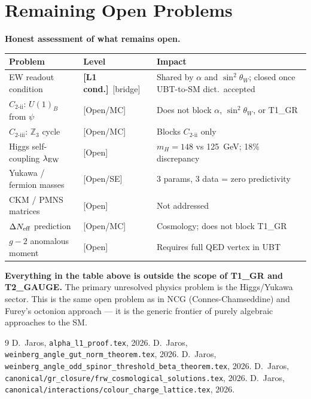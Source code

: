 \documentclass[12pt,a4paper]{article}
\theoremstyle{remark}\newtheorem{remark}[theorem]{Remark}
\newcommand{\Lc}{\textbf{[L1 cond.]}}
\begin{document}
\section{Remaining Open Problems}
\label{sec:open}

\begin{statusbox}
\textbf{Honest assessment of what remains open.}

\begin{center}
\renewcommand{\arraystretch}{1.25}\footnotesize
\begin{tabular}{p{5cm}p{2.2cm}p{5cm}}
\toprule
Problem & Level & Impact \\
\midrule
EW readout condition & \Lc\ [bridge] & Shared by $\alpha$ and $\sin^2\theta_W$;
  closed once UBT-to-SM dict.\ accepted \\
$C_{2\text{-ii}}$: $U(1)_B$ from $\psi$ & [Open/MC] & Does not block
  $\alpha$, $\sin^2\theta_W$, or T1\_GR \\
$C_{2\text{-iii}}$: $\mathbb{Z}_3$ cycle & [Open/MC] & Blocks $C_{2\text{-ii}}$
  only \\
Higgs self-coupling $\lambda_{\rm EW}$ & [Open] & $m_H=148$ vs 125~GeV;
  18\% discrepancy \\
Yukawa / fermion masses & [Open/SE] & 3 params, 3 data = zero predictivity \\
CKM / PMNS matrices & [Open] & Not addressed \\
$\Delta N_{\rm eff}$ prediction & [Open/MC] & Cosmology; does not block T1\_GR \\
$g{-}2$ anomalous moment & [Open] & Requires full QED vertex in UBT \\
\bottomrule
\end{tabular}
\end{center}

\medskip
\textbf{Everything in the table above is outside the scope of T1\_GR and T2\_GAUGE.}
The primary unresolved physics problem is the Higgs/Yukawa sector.
This is the same open problem as in NCG (Connes-Chamseddine) and
Furey's octonion approach — it is the generic frontier of purely
algebraic approaches to the SM.
\end{statusbox}

\begin{thebibliography}{9}
  D.~Jaros, \texttt{alpha\_l1\_proof.tex}, 2026.
  D.~Jaros, \texttt{weinberg\_angle\_gut\_norm\_theorem.tex}, 2026.
  D.~Jaros, \texttt{weinberg\_angle\_odd\_spinor\_threshold\_beta\_theorem.tex}, 2026.
  D.~Jaros, \texttt{canonical/gr\_closure/frw\_cosmological\_solutions.tex}, 2026.
  D.~Jaros, \texttt{canonical/interactions/colour\_charge\_lattice.tex}, 2026.
\end{thebibliography}

\ifdefined\INCLUDEMODE\else
\end{document}
